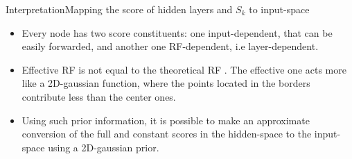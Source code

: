 \documentclass{beamer}
\begin{document}
\begin{frame}{Interpretation}{Mapping the score of hidden layers and $S_k$ to input-space}
\begin{itemize}
\item Every node has two score constituents: one input-dependent, that can be easily forwarded, and another one RF-dependent, i.e layer-dependent. 

\item Effective RF is not equal to the theoretical RF \citep{luo2016understanding}. The effective one acts more like a 2D-gaussian function, where the points located in the borders contribute less than the center ones. 

\item Using such prior information, it is possible to make an approximate conversion of the full and constant scores in the hidden-space to the input-space using a 2D-gaussian prior.
\end{itemize}
\end{frame}
\end{document}
